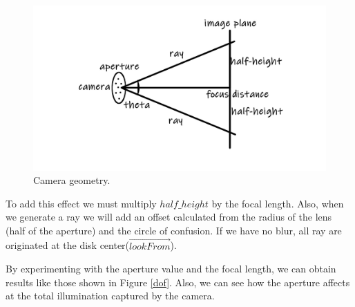 \documentclass[titlepage,12pt]{report}
\begin{document}
\begin{figure}[!ht]
	\centering
	\includegraphics[scale=0.65]{media/camera-model-summary-2.jpg}
	\caption{Camera geometry.}
	\label{camegeom3}
\end{figure}

To add this effect we must multiply $half\_height$ by the focal length. Also, when we generate a ray we will add an offset calculated from the radius of the lens (half of the aperture) and the circle of confusion. If we have no blur, all ray are originated at the disk center($\vec{lookFrom}$).

By experimenting with the aperture value and the focal length, we can obtain results like those shown in Figure \ref{dof}. Also, we can see how the aperture affects at the total illumination captured by the camera.
\end{document}
